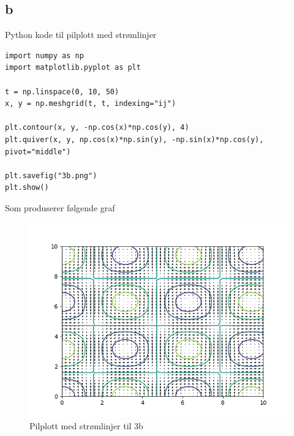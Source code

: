 \documentclass[a4paper,10pt,norsk]{article}
\begin{document}
	\subsection*{b}
		Python kode til pilplott med strømlinjer
\begin{lstlisting}
import numpy as np
import matplotlib.pyplot as plt

t = np.linspace(0, 10, 50)
x, y = np.meshgrid(t, t, indexing="ij")

plt.contour(x, y, -np.cos(x)*np.cos(y), 4)
plt.quiver(x, y, np.cos(x)*np.sin(y), -np.sin(x)*np.cos(y), pivot="middle")

plt.savefig("3b.png")
plt.show()
\end{lstlisting}
		Som produserer følgende graf
		\begin{figure}[h!]
			\centering
			\caption{Pilplott med strømlinjer til 3b}
			\label{fig:3b}
			\includegraphics{3b.png}
		\end{figure}
		\newpage
		
\end{document}
